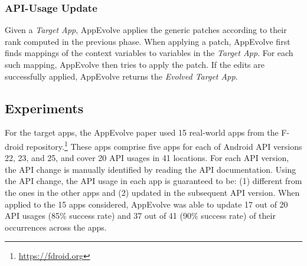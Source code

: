 \subsubsection{API-Usage Update}
Given a {\em Target App}, AppEvolve applies the generic patches according
to their rank computed in the previous phase. When applying a patch,
AppEvolve first finds mappings of the context variables to variables in the
{\em Target App}. For each such mapping, AppEvolve then tries to apply the
patch. If the edits are successfully applied, AppEvolve returns the {\em
  Evolved Target App}.

\subsection{Experiments}
For the target apps, the AppEvolve paper used 15 real-world apps from the
F-droid repository.\footnote{\url{https://fdroid.org}} These apps comprise
five apps for each of Android API versions 22, 23, and 25, and cover 20 API
usages in 41 locations. For each API version, the API change is manually
identified by reading the API documentation. Using the API change, the API
usage in each app is guaranteed to be: (1) different from the ones in the
other apps and (2) updated in the subsequent API version.  When applied to
the 15 apps considered, AppEvolve was able to update 17 out of 20 API
usages (85\% success rate) and 37 out of 41 (90\% success rate) of their occurrences across
the apps. %

